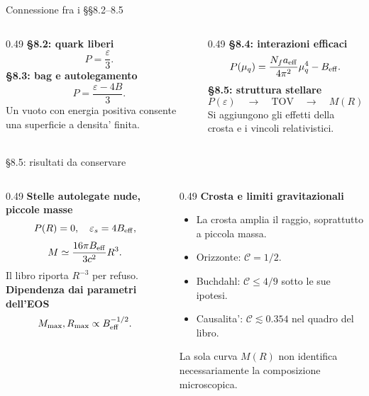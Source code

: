 \begin{frame}{Connessione fra i \S\S8.2--8.5}
\footnotesize
\begin{columns}[T,onlytextwidth]
\begin{column}{0.49\textwidth}
\textbf{\S8.2: quark liberi}
\[
P=\frac{\varepsilon}{3}.
\]
\textbf{\S8.3: bag e autolegamento}
\[
P=\frac{\varepsilon-4B}{3}.
\]
Un vuoto con energia positiva consente una superficie a densita' finita.
\end{column}
\begin{column}{0.49\textwidth}
\textbf{\S8.4: interazioni efficaci}
\[
P(\mu_q)=\frac{N_fa_{\rm eff}}{4\pi^2}\mu_q^4
-B_{\rm eff}.
\]
\textbf{\S8.5: struttura stellare}
\[
P(\varepsilon)\quad\longrightarrow\quad
\text{TOV}\quad\longrightarrow\quad M(R).
\]
Si aggiungono gli effetti della crosta e i vincoli relativistici.
\end{column}
\end{columns}
\end{frame}

\begin{frame}{\S8.5: risultati da conservare}
\small
\begin{columns}[T,onlytextwidth]
\begin{column}{0.49\textwidth}
\textbf{Stelle autolegate nude, piccole masse}
\[
P(R)=0,\quad \varepsilon_s=4B_{\rm eff},
\]
\[
M\simeq\frac{16\pi B_{\rm eff}}{3c^2}R^3.
\]
Il libro riporta $R^{-3}$ per refuso.
\medskip
\textbf{Dipendenza dai parametri dell'EOS}
\[
M_{\max},R_{\max}\propto B_{\rm eff}^{-1/2}.
\]
\end{column}
\begin{column}{0.49\textwidth}
\textbf{Crosta e limiti gravitazionali}
\begin{itemize}
\item La crosta amplia il raggio, soprattutto a piccola massa.
\item Orizzonte: $\mathcal C=1/2$.
\item Buchdahl: $\mathcal C\leq4/9$ sotto le sue ipotesi.
\item Causalita': $\mathcal C\lesssim0.354$ nel quadro del libro.
\end{itemize}
\medskip
La sola curva $M(R)$ non identifica necessariamente la composizione microscopica.
\end{column}
\end{columns}
\end{frame}

